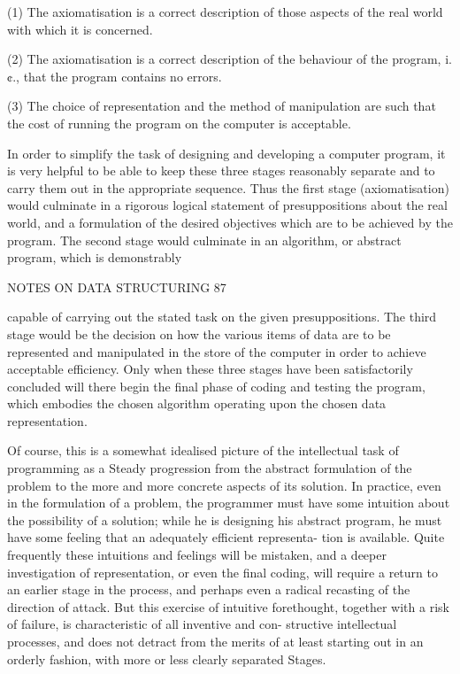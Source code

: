 (1) The axiomatisation is a correct description of those aspects of the real world with which it is concerned.

(2) The axiomatisation is a correct description of the behaviour of the program, i.¢., that the program contains no errors.

(3) The choice of representation and the method of manipulation are such that the cost of running the program on the computer is acceptable.

In order to simplify the task of designing and developing a computer program, it is very helpful to be able to keep these three stages reasonably separate and to carry them out in the appropriate sequence. Thus the first stage (axiomatisation) would culminate in a rigorous logical statement of presuppositions about the real world, and a formulation of the desired objectives which are to be achieved by the program. The second stage would culminate in an algorithm, or abstract program, which is demonstrably

NOTES ON DATA STRUCTURING 87

capable of carrying out the stated task on the given presuppositions. The third stage would be the decision on how the various items of data are to be represented and manipulated in the store of the computer in order to achieve acceptable efficiency. Only when these three stages have been satisfactorily concluded will there begin the final phase of coding and testing the program, which embodies the chosen algorithm operating upon the chosen data representation.

Of course, this is a somewhat idealised picture of the intellectual task of programming as a Steady progression from the abstract formulation of the problem to the more and more concrete aspects of its solution. In practice, even in the formulation of a problem, the programmer must have some intuition about the possibility of a solution; while he is designing his abstract program, he must have some feeling that an adequately efficient representa- tion is available. Quite frequently these intuitions and feelings will be mistaken, and a deeper investigation of representation, or even the final coding, will require a return to an earlier stage in the process, and perhaps even a radical recasting of the direction of attack. But this exercise of intuitive forethought, together with a risk of failure, is characteristic of all inventive and con- structive intellectual processes, and does not detract from the merits of at least starting out in an orderly fashion, with more or less clearly separated Stages.

